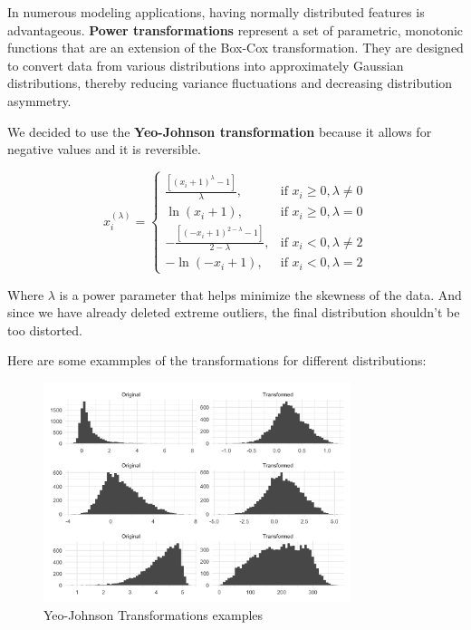 \documentclass[11pt,english,a4paper,hidelinks]{book}
\begin{document}
In numerous modeling applications, having normally distributed features is advantageous. \textbf{Power transformations} represent a set of parametric, monotonic functions that are an extension of the Box-Cox transformation. They are designed to convert data from various distributions into approximately Gaussian distributions, thereby reducing variance fluctuations and decreasing distribution asymmetry. 

\vspace{0.5cm}
\noindent We decided to use the \textbf{Yeo-Johnson transformation} because it allows for negative values and it is reversible.

\begin{equation}
x_i^{(\lambda)} =
\begin{cases}
\frac{[(x_i + 1)^\lambda - 1]}{\lambda}, & \text{if } x_i \geq 0, \lambda \neq 0 \\
\ln(x_i + 1), & \text{if } x_i \geq 0, \lambda = 0 \\
-\frac{[(-x_i + 1)^{2 - \lambda} - 1]}{2 - \lambda}, & \text{if } x_i < 0, \lambda \neq 2 \\
-\ln(-x_i + 1), & \text{if } x_i < 0, \lambda = 2
\end{cases}
\end{equation}

\noindent Where \(\lambda\) is a power parameter that helps minimize the skewness of the data. And since we have already deleted extreme outliers, the final distribution shouldn't be too distorted.

\vspace{0.5cm}

\noindent Here are some exammples of the transformations for different distributions:

\begin{figure}[H]
    \centering
    \includegraphics[width=0.8\textwidth]{images/code/transformations/yeo-johnson.png}
    \caption{Yeo-Johnson Transformations examples}
    \label{fig:yeo-johnson}
\end{figure}
\end{document}

